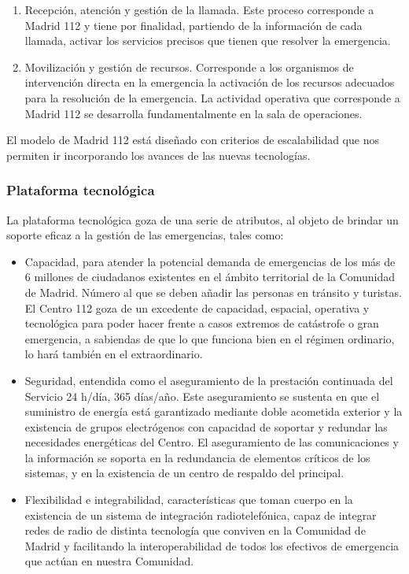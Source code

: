 \begin{enumerate}
  \item Recepción, atención y gestión de la llamada. Este proceso corresponde a Madrid 112 y tiene por finalidad, partiendo de la información de cada llamada, activar los servicios precisos que tienen que resolver la emergencia.
  \item Movilización y gestión de recursos. Corresponde a los organismos de intervención directa en la emergencia la activación de los recursos adecuados para la resolución de la emergencia. La actividad operativa que corresponde a Madrid 112 se desarrolla fundamentalmente en la sala de operaciones.
\end{enumerate}

El modelo de Madrid 112 está diseñado con criterios de escalabilidad que nos permiten ir incorporando los avances de las nuevas tecnologías.

\subsubsection{Plataforma tecnológica}

La plataforma tecnológica goza de una serie de atributos, al objeto de brindar un soporte eficaz a la gestión de las emergencias, tales como:

\begin{itemize}
  \item Capacidad, para atender la potencial demanda de emergencias de los más de 6 millones de ciudadanos existentes en el ámbito territorial de la Comunidad de Madrid. Número al que se deben añadir las personas en tránsito y turistas. El Centro 112 goza de un excedente de capacidad, espacial, operativa y tecnológica para poder hacer frente a casos extremos de catástrofe o gran emergencia, a sabiendas de que lo que funciona bien en el régimen ordinario, lo hará también en el extraordinario.
  \item Seguridad, entendida como el aseguramiento de la prestación continuada del Servicio 24 h/día, 365 días/año. Este aseguramiento se sustenta en que el suministro de energía está garantizado mediante doble acometida exterior y la existencia de grupos electrógenos con capacidad de soportar y redundar las necesidades energéticas del Centro. El aseguramiento de las comunicaciones y la información se soporta en la redundancia de elementos críticos de los sistemas, y en la existencia de un centro de respaldo del principal.
  \item Flexibilidad e integrabilidad, características que toman cuerpo en la existencia de un sistema de integración radiotelefónica, capaz de integrar redes de radio de distinta tecnología que conviven en la Comunidad de Madrid y facilitando la interoperabilidad de todos los efectivos de emergencia que actúan en nuestra Comunidad.
\end{itemize}

